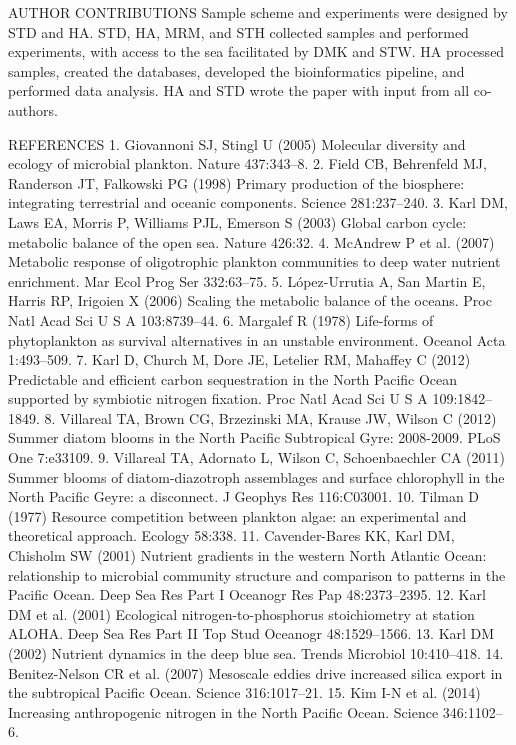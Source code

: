 AUTHOR CONTRIBUTIONS
Sample scheme and experiments were designed by STD and HA. STD, HA, MRM, and STH collected samples and performed experiments, with access to the sea facilitated by DMK and STW. HA processed samples, created the databases, developed the bioinformatics pipeline, and performed data analysis. HA and STD wrote the paper with input from all co-authors.

REFERENCES
1. 	Giovannoni SJ, Stingl U (2005) Molecular diversity and ecology of microbial plankton. Nature 437:343–8.
2. 	Field CB, Behrenfeld MJ, Randerson JT, Falkowski PG (1998) Primary production of the biosphere: integrating terrestrial and oceanic components. Science 281:237–240.
3. 	Karl DM, Laws EA, Morris P, Williams PJL, Emerson S (2003) Global carbon cycle: metabolic balance of the open sea. Nature 426:32.
4. 	McAndrew P et al. (2007) Metabolic response of oligotrophic plankton communities to deep water nutrient enrichment. Mar Ecol Prog Ser 332:63–75.
5. 	López-Urrutia A, San Martin E, Harris RP, Irigoien X (2006) Scaling the metabolic balance of the oceans. Proc Natl Acad Sci U S A 103:8739–44.
6. 	Margalef R (1978) Life-forms of phytoplankton as survival alternatives in an unstable environment. Oceanol Acta 1:493–509.
7. 	Karl D, Church M, Dore JE, Letelier RM, Mahaffey C (2012) Predictable and efficient carbon sequestration in the North Pacific Ocean supported by symbiotic nitrogen fixation. Proc Natl Acad Sci U S A 109:1842–1849.
8. 	Villareal TA, Brown CG, Brzezinski MA, Krause JW, Wilson C (2012) Summer diatom blooms in the North Pacific Subtropical Gyre: 2008-2009. PLoS One 7:e33109.
9. 	Villareal TA, Adornato L, Wilson C, Schoenbaechler CA (2011) Summer blooms of diatom-diazotroph assemblages and surface chlorophyll in the North Pacific Geyre: a disconnect. J Geophys Res 116:C03001.
10. 	Tilman D (1977) Resource competition between plankton algae: an experimental and theoretical approach. Ecology 58:338.
11. 	Cavender-Bares KK, Karl DM, Chisholm SW (2001) Nutrient gradients in the western North Atlantic Ocean: relationship to microbial community structure and comparison to patterns in the Pacific Ocean. Deep Sea Res Part I Oceanogr Res Pap 48:2373–2395.
12. 	Karl DM et al. (2001) Ecological nitrogen-to-phosphorus stoichiometry at station ALOHA. Deep Sea Res Part II Top Stud Oceanogr 48:1529–1566.
13. 	Karl DM (2002) Nutrient dynamics in the deep blue sea. Trends Microbiol 10:410–418.
14. 	Benitez-Nelson CR et al. (2007) Mesoscale eddies drive increased silica export in the subtropical Pacific Ocean. Science 316:1017–21.
15. 	Kim I-N et al. (2014) Increasing anthropogenic nitrogen in the North Pacific Ocean. Science 346:1102–6.
